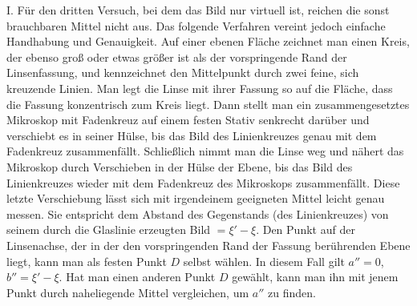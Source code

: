 I. Für den dritten Versuch, bei dem das Bild nur virtuell ist, reichen die sonst brauchbaren Mittel nicht aus. Das folgende Verfahren vereint jedoch einfache Handhabung und Genauigkeit. Auf einer ebenen Fläche zeichnet man einen Kreis, der ebenso groß oder etwas größer ist als der vorspringende Rand der Linsenfassung, und kennzeichnet den Mittelpunkt durch zwei feine, sich kreuzende Linien. Man legt die Linse mit ihrer Fassung so auf die Fläche, dass die Fassung konzentrisch zum Kreis liegt. Dann stellt man ein zusammengesetztes Mikroskop mit Fadenkreuz auf einem festen Stativ senkrecht darüber und verschiebt es in seiner Hülse, bis das Bild des Linienkreuzes genau mit dem Fadenkreuz zusammenfällt. Schließlich nimmt man die Linse weg und nähert das Mikroskop durch Verschieben in der Hülse der Ebene, bis das Bild des Linienkreuzes wieder mit dem Fadenkreuz des Mikroskops zusammenfällt. Diese letzte Verschiebung lässt sich mit irgendeinem geeigneten Mittel leicht genau messen. Sie entspricht dem Abstand des Gegenstands (des Linienkreuzes) von seinem durch die Glaslinie erzeugten Bild $=\xi'-\xi$. Den Punkt auf der Linsenachse, der in der den vorspringenden Rand der Fassung berührenden Ebene liegt, kann man als festen Punkt $D$ selbst wählen. In diesem Fall gilt $a''=0$, $b''=\xi'-\xi$. Hat man einen anderen Punkt $D$ gewählt, kann man ihn mit jenem Punkt durch naheliegende Mittel vergleichen, um $a''$ zu finden.

